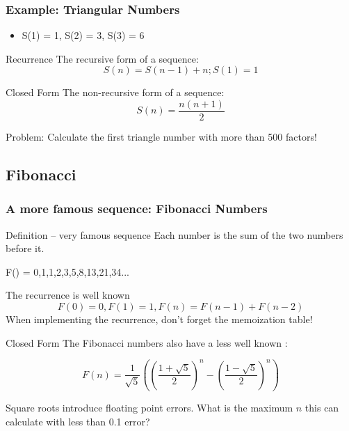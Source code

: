 \documentclass{beamer}
\begin{document}
\begin{frame}
  \frametitle{Example: Triangular Numbers}
  {\smaller
    \begin{itemize}
    \item S(1) = 1, S(2) = 3, S(3) = 6
    \end{itemize}

    \begin{block}{Recurrence}
      The recursive form of a sequence:
      \begin{equation*}
        S(n) = S(n-1)+n; S(1) = 1
      \end{equation*}
    \end{block}
    \begin{block}{Closed Form}
      The non-recursive form of a sequence:
      \begin{equation*}
        S(n) = \frac{n(n+1)}{2}
      \end{equation*}
    \end{block}
    \alert{Problem:} Calculate the first triangle number with more
    than 500 factors!  }
\end{frame}

\subsection{Fibonacci}

\begin{frame}
  \frametitle{A more famous sequence: Fibonacci Numbers}

  {\smaller
  \begin{block}{Definition -- very famous sequence}
    Each number is the sum of the two numbers before it.

    \medskip

    F() = 0,1,1,2,3,5,8,13,21,34...
  \end{block}

  \begin{block}{The recurrence is well known}
  \begin{equation*}
  F(0) = 0, F(1) = 1, F(n) = F(n-1)+F(n-2)
  \end{equation*}
  When implementing the recurrence, don't forget the memoization
  table!
  \end{block}

  \begin{block}{Closed Form}
    The Fibonacci numbers also have a less well known
    :

    \begin{equation*}
      F(n) = \frac{1}{\sqrt{5}}\left(\left(\frac{1+\sqrt{5}}{2}\right)^n-\left(\frac{1-\sqrt{5}}{2}\right)^n\right)
    \end{equation*}
  \end{block}
    Square roots introduce floating point errors. What is the maximum
    $n$ this can calculate with less than 0.1 error?
  }
\end{frame}
\end{document}
